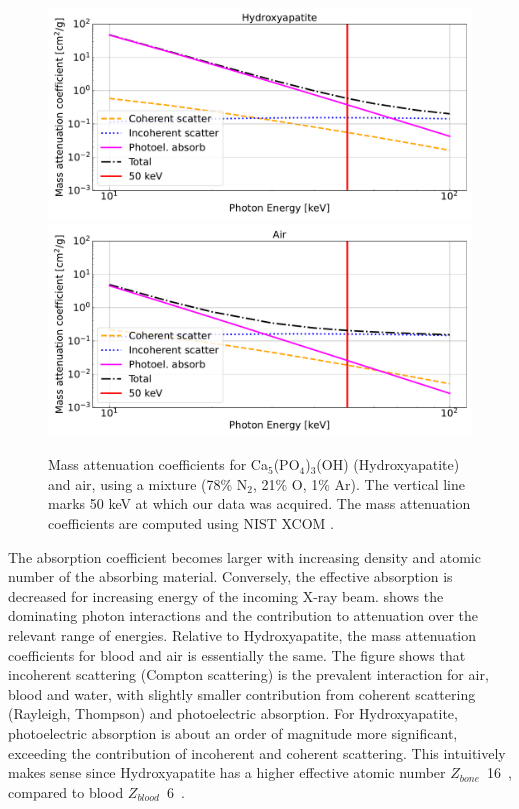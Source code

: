 \begin{figure}
    \centering
    \includegraphics[width=\linewidth]{figures/attenuation_bone.pdf}
    \includegraphics[width=\linewidth]{figures/attenuation_air.pdf}
    \caption{
	    Mass attenuation coefficients for Ca$_{5}$(PO$_{4}$)$_{3}$(OH)
	    (Hydroxyapatite) and air, using a mixture (78\% N$_{2}$, 21\% O, 1\%
	    Ar). The vertical line marks 50 keV at which our data was acquired. The
	    mass attenuation coefficients are computed using NIST XCOM
	    \citep{NIST-XCOM}.
    }
\label{fig:attenuation}
\end{figure}

The absorption coefficient becomes larger with increasing density and atomic
number of the absorbing material. Conversely, the effective absorption is
decreased for increasing energy of the incoming X-ray beam.
 shows the dominating photon interactions and the
contribution to attenuation over the relevant range of energies. Relative to
Hydroxyapatite, the mass attenuation coefficients for blood and air is
essentially the same. The figure shows that incoherent scattering (Compton
scattering) is the prevalent interaction for air, blood and water, with slightly
smaller contribution from coherent scattering (Rayleigh, Thompson) and
photoelectric absorption. For Hydroxyapatite, photoelectric absorption is about
an order of magnitude more significant, exceeding the contribution of incoherent
and coherent scattering. This intuitively makes sense since Hydroxyapatite has a
higher effective atomic number $Z_{bone}$~16~\cite{hydroxyapatite_absorption},
compared to blood $Z_{blood}$~6~\cite{effective_atomic_number}.

